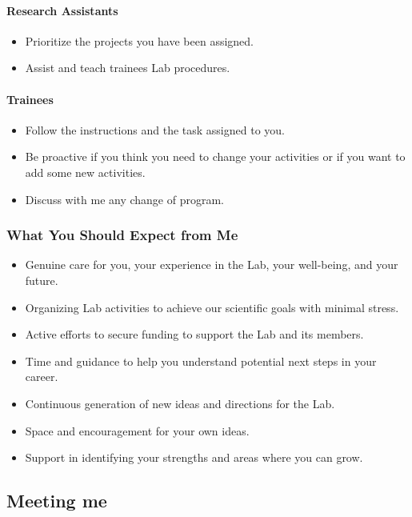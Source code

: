 \documentclass[12pt]{article}
\begin{document}
\paragraph{Research Assistants}
\begin{itemize}
\item Prioritize the projects you have been assigned.
\item Assist and teach trainees Lab procedures.
\end{itemize}

\paragraph{Trainees}
\begin{itemize}
\item Follow the instructions and the task assigned to you.
\item Be proactive if you think you need to change your activities or if you want to add some new activities.
\item Discuss with me any change of program.
\end{itemize}

\subsubsection{What You Should Expect from Me}
\begin{itemize}
\item Genuine care for you, your experience in the Lab, your well-being, and your future.
\item Organizing Lab activities to achieve our scientific goals with minimal stress.
\item Active efforts to secure funding to support the Lab and its members.
\item Time and guidance to help you understand potential next steps in your career.
\item Continuous generation of new ideas and directions for the Lab.
\item Space and encouragement for your own ideas.
\item Support in identifying your strengths and areas where you can grow.
\end{itemize}

\subsection{Meeting me}
\end{document}
